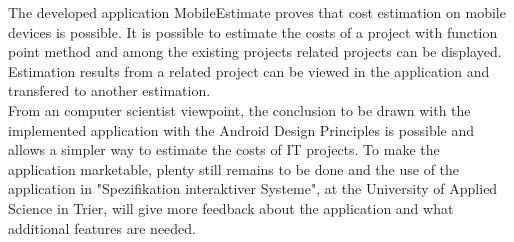 The developed application MobileEstimate proves that cost estimation on mobile devices is possible. It is possible to estimate the costs of a project with function point method and among the existing projects related projects can be displayed. Estimation results from a related project can be viewed in the application and transfered to another estimation.\\
From an computer scientist viewpoint, the conclusion to be drawn with the implemented application with the Android Design Principles is possible and allows a simpler way to estimate the costs of IT projects. To make the application marketable, plenty still remains to be done and the use of the application in "Spezifikation interaktiver Systeme", at the University of Applied Science in Trier, will give more feedback about the application and what additional features are needed.\\
